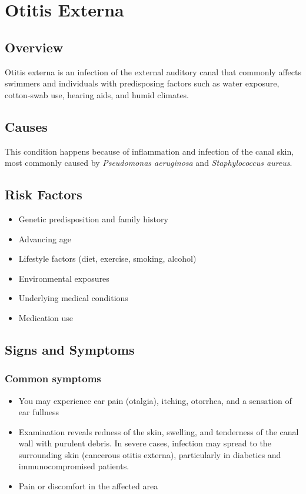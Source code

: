 \chapter{Otitis Externa}
\label{sec:Otitis Externa}

\section{Overview}
Otitis externa is an infection of the external auditory canal that commonly affects swimmers and individuals with predisposing factors such as water exposure, cotton-swab use, hearing aids, and humid climates.
\section{Causes}
This condition happens because of inflammation and infection of the canal skin, most commonly caused by \textit{Pseudomonas aeruginosa} and \textit{Staphylococcus aureus}.     
\section{Risk Factors}

\begin{itemize}[noitemsep]
  \item Genetic predisposition and family history
  \item Advancing age
  \item Lifestyle factors (diet, exercise, smoking, alcohol)
  \item Environmental exposures
  \item Underlying medical conditions
  \item Medication use
\end{itemize}
\section{Signs and Symptoms}

\subsection{Common symptoms}
\begin{itemize}[noitemsep]
  \item You may experience ear pain (otalgia), itching, otorrhea, and a sensation of ear fullness
  \item Examination reveals redness of the skin, swelling, and tenderness of the canal wall with purulent debris. In severe cases, infection may spread to the surrounding skin (cancerous otitis externa), particularly in diabetics and immunocompromised patients.
  \item Pain or discomfort in the affected area
  \end{itemize}

